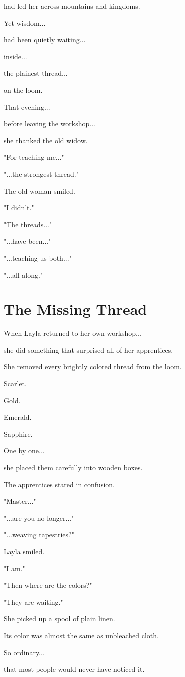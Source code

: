 \documentclass[12pt,openany]{book}
\begin{document}
had led her across mountains and kingdoms.

Yet wisdom...

had been quietly waiting...

inside...

the plainest thread...

on the loom.

That evening...

before leaving the workshop...

she thanked the old widow.

"For teaching me..."

"...the strongest thread."

The old woman smiled.

"I didn't."

"The threads..."

"...have been..."

"...teaching us both..."

"...all along."
\section*{The Missing Thread}

When Layla returned to her own workshop...

she did something that surprised all of her apprentices.

She removed every brightly colored thread from the loom.

Scarlet.

Gold.

Emerald.

Sapphire.

One by one...

she placed them carefully into wooden boxes.

The apprentices stared in confusion.

"Master..."

"...are you no longer..."

"...weaving tapestries?"

Layla smiled.

"I am."

"Then where are the colors?"

"They are waiting."

She picked up a spool of plain linen.

Its color was almost the same as unbleached cloth.

So ordinary...

that most people would never have noticed it.
\end{document}
